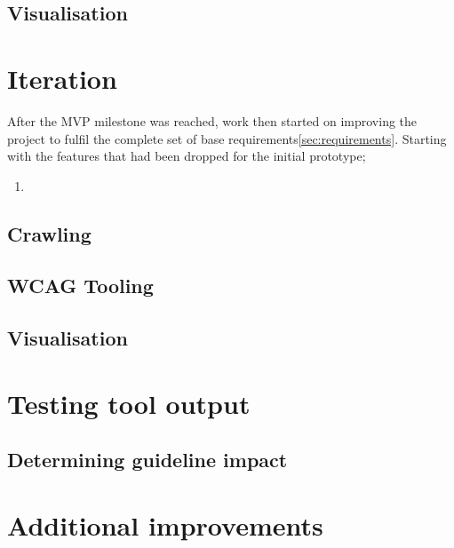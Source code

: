 
\subsection{Visualisation}

\section{Iteration}
After the MVP milestone was reached, work then started on improving the project to fulfil the complete set of base requirements\ref{sec:requirements}. Starting with the features that had been dropped for the initial prototype;
\begin{enumerate}
    \item 
\end{enumerate}

\subsection{Crawling}

\subsection{WCAG Tooling}

\subsection{Visualisation}

\section{Testing tool output}

\subsection{Determining guideline impact}

\section{Additional improvements}